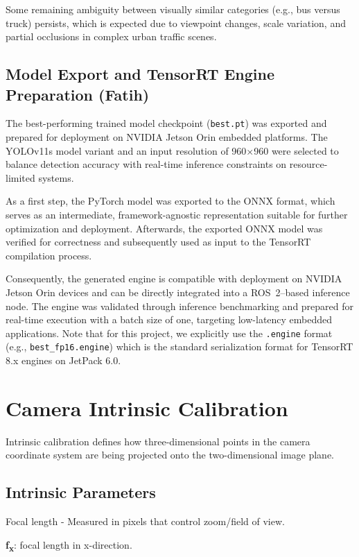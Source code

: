 \documentclass[12pt,a4paper]{report}
\begin{document}
Some remaining ambiguity between visually similar categories (e.g., bus versus truck) persists, which is expected due to viewpoint changes, scale variation, and partial occlusions in complex urban traffic scenes.

 

\subsection{Model Export and TensorRT Engine Preparation (Fatih)}

The best-performing trained model checkpoint (\texttt{best.pt}) was exported and prepared for deployment on NVIDIA Jetson Orin embedded platforms. The YOLOv11s model variant and an input resolution of 960×960 were selected to balance detection accuracy with real-time inference constraints on resource-limited systems.

As a first step, the PyTorch model was exported to the ONNX format, which serves as an intermediate, framework-agnostic representation suitable for further optimization and deployment. Afterwards, the exported ONNX model was verified for correctness and subsequently used as input to the TensorRT compilation process.

Consequently, the generated engine is compatible with deployment on NVIDIA Jetson Orin devices and can be directly integrated into a ROS~2–based inference node. The engine was validated through inference benchmarking and prepared for real-time execution with a batch size of one, targeting low-latency embedded applications. Note that for this project, we explicitly use the \texttt{.engine} format (e.g., \texttt{best\_fp16.engine}) which is the standard serialization format for TensorRT 8.x engines on JetPack 6.0.

\section{Camera Intrinsic Calibration}
Intrinsic calibration defines how three-dimensional points in the camera coordinate system are being projected onto the two-dimensional image plane. 

\subsection{Intrinsic Parameters}
Focal length - Measured in pixels that control zoom/field of view.

\textbf{f\textsubscript{x}}: focal length in x-direction.
\end{document}
